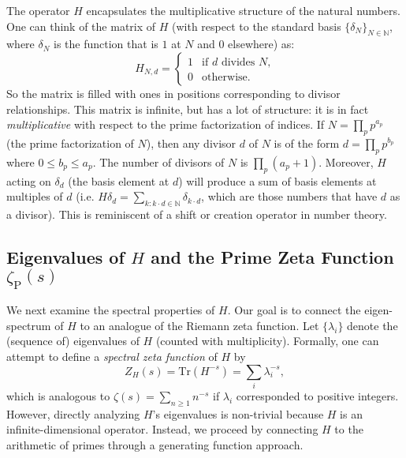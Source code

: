 \documentclass[11pt]{article}
\begin{document}
The operator $H$ encapsulates the multiplicative structure of the natural numbers. One can think of the matrix of $H$ (with respect to the standard basis $\{\delta_N\}_{N\in\mathbb{N}}$, where $\delta_N$ is the function that is $1$ at $N$ and $0$ elsewhere) as:
\[ H_{N,d} = 
\begin{cases}
1 & \text{if $d$ divides $N$,}\\
0 & \text{otherwise.}
\end{cases} \]
So the matrix is filled with ones in positions corresponding to divisor relationships. This matrix is infinite, but has a lot of structure: it is in fact \emph{multiplicative} with respect to the prime factorization of indices. If $N = \prod_{p} p^{a_p}$ (the prime factorization of $N$), then any divisor $d$ of $N$ is of the form $d = \prod_{p} p^{b_p}$ where $0 \le b_p \le a_p$. The number of divisors of $N$ is $\prod_{p}(a_p+1)$. Moreover, $H$ acting on $\delta_d$ (the basis element at $d$) will produce a sum of basis elements at multiples of $d$ (i.e. $H \delta_d = \sum_{k: k\cdot d \in \mathbb{N}} \delta_{k\cdot d}$, which are those numbers that have $d$ as a divisor). This is reminiscent of a shift or creation operator in number theory.

\subsection*{Eigenvalues of $H$ and the Prime Zeta Function $\zeta_{\mathrm{P}}(s)$}

We next examine the spectral properties of $H$. Our goal is to connect the eigen-spectrum of $H$ to an analogue of the Riemann zeta function. Let $\{\lambda_i\}$ denote the (sequence of) eigenvalues of $H$ (counted with multiplicity). Formally, one can attempt to define a \emph{spectral zeta function} of $H$ by 
\[ Z_H(s) = \mathrm{Tr}(H^{-s}) = \sum_i \lambda_i^{-s}, \] 
which is analogous to $\zeta(s) = \sum_{n\ge1} n^{-s}$ if $\lambda_i$ corresponded to positive integers. However, directly analyzing $H$'s eigenvalues is non-trivial because $H$ is an infinite-dimensional operator. Instead, we proceed by connecting $H$ to the arithmetic of primes through a generating function approach.
\end{document}
